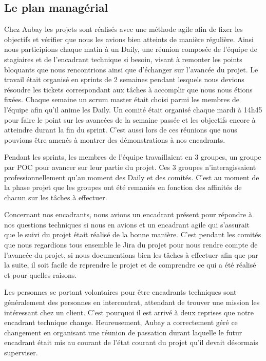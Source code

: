 \documentclass[11pt]{article}
\begin{document}
    \subsection{Le plan managérial}
      Chez Aubay les projets sont réalisés avec une méthode agile afin de fixer les objectifs et vérifier que nous les avions bien atteints
      de manière régulière. Ainsi nous participions chaque matin à un Daily, une réunion
      composée de l'équipe de stagiaires et de l'encadrant technique si besoin, 
      visant à remonter les points bloquants que nous rencontrions ainsi que d'échanger sur l'avancée du projet.
      Le travail était organisé en sprints de 2 semaines pendant lesquels nous devions résoudre les tickets
      correspondant aux tâches à accomplir que nous nous étions fixées. Chaque semaine un scrum master était
      choisi parmi les membres de l'équipe afin qu'il anime les Daily. Un comité était organisé chaque mardi
      à 14h45 pour faire le point sur les avancées de la semaine passée et les objectifs encore à atteindre
      durant la fin du sprint. C'est aussi lors de ces réunions que nous pouvions être amenés à montrer des 
      démonstrations à nos encadrants. 

      Pendant les sprints, les membres de l'équipe travaillaient en 3 groupes, un groupe par POC pour avancer 
      sur leur partie du projet. Ces 3 groupes n'interagissaient professionnellement qu'au moment des Daily
      et des comités. C'est au moment de la phase projet que les groupes ont été remaniés en fonction des
      affinités de chacun sur les tâches à effectuer.

      Concernant nos encadrants, nous avions un encadrant présent pour répondre à nos questions 
      techniques si nous en avions et un encadrant agile qui s'assurait que le suivi du projet était réalisé 
      de la bonne manière. C'est pendant les comités que nous regardions tous ensemble le Jira du projet pour nous
      rendre compte de l'avancée du projet, si nous documentions bien les tâches à effectuer afin que par la suite, 
      il soit facile de reprendre le projet et de comprendre ce qui a été réalisé et pour quelles raisons.

      Les personnes se portant volontaires pour être encadrants techniques sont généralement des personnes en
      intercontrat, attendant de trouver une mission les intéressant chez un client. C'est pourquoi il est 
      arrivé à deux reprises que notre encadrant technique change. Heureusement, Aubay a correctement géré 
      ce changement en organisant une réunion de passation durant laquelle le futur encadrant était mis au 
      courant de l'état courant du projet qu'il devait désormais superviser.
\end{document}
